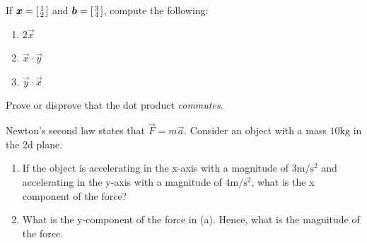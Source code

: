 \begin{problem}
  If \(\vec{x}=\begin{bsmallmatrix}
    1 \\
    2
  \end{bsmallmatrix} \) and \(\vec{b}=\begin{bsmallmatrix}
    3 \\
    4
  \end{bsmallmatrix} \), compute the following: \begin{enumerate}[label=\alph*)]
    \item{\(2\vec{x}\)}
    \item{\(\vec{x}\cdot\vec{y}\)}
    \item{\(\vec{y}\cdot\vec{x}\)}
  \end{enumerate} 
\end{problem}
\begin{problem}[1]
  Prove or disprove that the dot product \textit{commutes}. \footnotemark 
\end{problem}
\begin{problem}[1]
  Newton's second law states that \(\vec{F}=m\vec{a}\). Consider an object with a mass \(10\si{\kilogram}\) in the 2d plane.
  \begin{enumerate}[label=\alph*)]
    \item{If the object is accelerating in the x-axis with a magnitude of \(3\si{\meter\per\second^2}\) and accelerating in the y-axis with a magnitude of \(4\si{\meter\per\second^2}\), what is the x component of the force?}
    \item{What is the y-component of the force in (a). Hence, what is the magnitude of the force.}
  \end{enumerate}
\end{problem}
%
